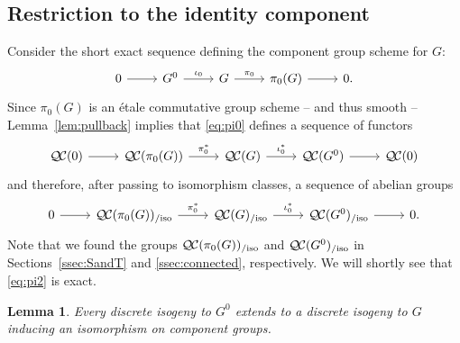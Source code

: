 \documentclass[CM,Submssn,SecEq]{degruyter-crelle} %
\theoremstyle{plain}
\newtheorem{lemma}[theorem]{Lemma}
\theoremstyle{definition}
\theoremstyle{remark}
\newcommand{\QC}{{\mathcal{Q\hskip-0.8pt C}}}
\newcommand{\QCiso}[1]{\QC(#1)_{/\text{iso}}}
\begin{document}
\subsection{Restriction to the identity component} \label{ssec:restriction}

Consider the short exact sequence
defining the component group scheme for $G$:
\begin{equation}\label{eq:pi0}
\begin{tikzcd}
0 \rar & G^0 \arrow{r}{\iota_0} & G \arrow{r}{\pi_0} & \pi_0(G) \rar & 0.
\end{tikzcd}
\end{equation}
Since $\pi_0(G)$ is an \'etale commutative group scheme -- and thus smooth --
Lemma~\ref{lem:pullback} implies that \eqref{eq:pi0} defines a sequence of functors
\begin{equation}\label{eq:pi1}
\begin{tikzcd}
\QC(0) \rar & \QC(\pi_0(G)) \arrow{r}{\pi_0^*} & \QC(G) \arrow{r}{\iota_0^*} & \QC(G^0) \rar & \QC(0)
\end{tikzcd}
\end{equation}
and therefore, after passing to isomorphism classes, a sequence of abelian groups
\begin{equation}\label{eq:pi2}
\begin{tikzcd}
0 \rar &
\QCiso{\pi_0(G)} \arrow{r}{\pi_0^*} & \QCiso{G} \arrow{r}{\iota_0^*} & \QCiso{G^0} \rar & 0.
\end{tikzcd}
\end{equation}
 Note that we found the groups $\QCiso{\pi_0(G)}$ and $\QCiso{G^0}$
in Sections~\ref{ssec:SandT} and \ref{ssec:connected}, respectively.
We will shortly see that \eqref{eq:pi2} is exact.


\begin{lemma}\label{lemma:ext}
Every discrete isogeny to $G^0$ extends to a discrete
isogeny to $G$ inducing an isomorphism on component groups.
\end{lemma}
\end{document}
